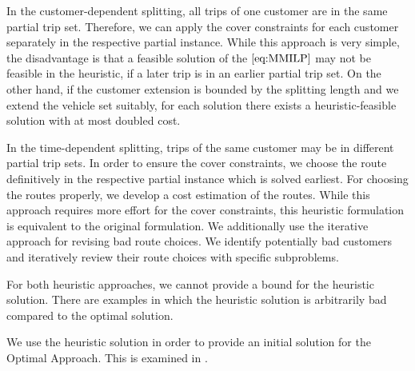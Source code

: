 In the customer-dependent splitting, all trips of one customer are in the same partial trip set. Therefore, we can apply the cover constraints for each customer separately in the respective partial instance. While this approach is very simple, the disadvantage is that a feasible solution of the $\eqref{eq:MMILP}$ may not be feasible in the heuristic, if a later trip is in an earlier partial trip set. On the other hand, if the customer extension is bounded by the splitting length and we extend the vehicle set suitably, for each solution there exists a heuristic-feasible solution with at most doubled cost.

In the time-dependent splitting, trips of the same customer may be in different partial trip sets. In order to ensure the cover constraints, we choose the route definitively in the respective partial instance which is solved earliest. For choosing the routes properly, we develop a cost estimation of the routes. While this approach requires more effort for the cover constraints, this heuristic formulation is equivalent to the original formulation. We additionally use the iterative approach for revising bad route choices. We identify potentially bad customers and iteratively review their route choices with specific subproblems.

For both heuristic approaches, we cannot provide a bound for the heuristic solution. There are examples in which the heuristic solution is arbitrarily bad compared to the optimal solution.

We use the heuristic solution in order to provide an initial solution for the Optimal Approach. This is examined in .